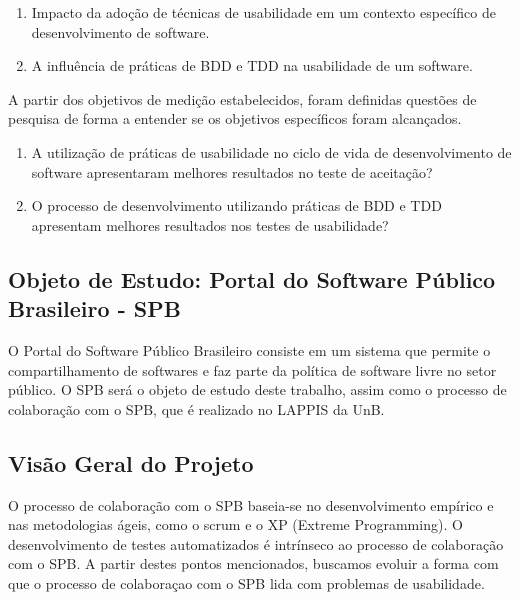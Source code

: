 \begin{enumerate}
\item Impacto da adoção de técnicas de usabilidade em um contexto específico de desenvolvimento de software.
\item A influência de práticas de BDD e TDD na usabilidade de um software. 
\end{enumerate}

A partir dos objetivos de medição estabelecidos, foram definidas questões de pesquisa de forma a entender se os objetivos específicos foram alcançados.

\begin{enumerate}
\item A utilização de práticas de usabilidade no ciclo de vida de desenvolvimento de software apresentaram melhores resultados no teste de aceitação?
\item O processo de desenvolvimento utilizando práticas de BDD e TDD apresentam melhores resultados nos testes de usabilidade?
\end{enumerate}


\subsection{Objeto de Estudo: Portal do Software Público Brasileiro - SPB}

O Portal do Software Público Brasileiro consiste em um sistema que permite o compartilhamento de softwares e faz parte da política de software livre no setor público.
O SPB será o objeto de estudo deste trabalho, assim como o processo de colaboração com o SPB, que é realizado no LAPPIS da UnB.

\subsection{Visão Geral do Projeto}

O processo de colaboração com o SPB baseia-se no desenvolvimento empírico e nas metodologias ágeis, como o scrum e o XP (Extreme Programming). O desenvolvimento de testes automatizados é intrínseco ao processo de colaboração com o SPB. A partir destes pontos mencionados, buscamos evoluir a forma com que o processo de colaboraçao com o SPB lida com problemas de usabilidade.

